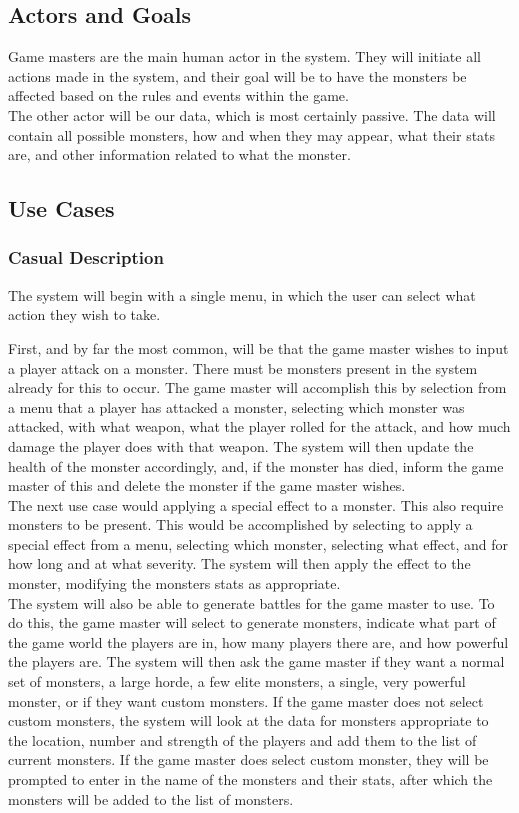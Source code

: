 \documentclass[letterpaper,12pt]{article}
\begin{document}
\subsection{Actors and Goals}
Game masters are the main human actor in the system. They will
initiate all actions made in the system, and their goal will be to
have the monsters be affected based on the rules and events within the
game.\\
The other actor will be our data, which is most certainly passive. The
data will contain all possible monsters, how and when they may appear,
what their stats are, and other information related to what the
monster.
\subsection{Use Cases}
\subsubsection{Casual Description}
The system will begin with a single menu, in which the user can select
what action they wish to take.

First, and by far the most common, will be that the game master wishes
to input a player attack on a monster. There must be monsters present
in the system already for this to occur. The game master will
accomplish this by selection from a menu that a player has attacked a
monster, selecting which monster was attacked, with what weapon, what
the player rolled for the attack, and how much damage the player does
with that weapon. The system will then update the health of the
monster accordingly, and, if the monster has died, inform the game
master of this and delete the monster if the game master wishes.\\

The next use case would applying a special effect to a monster. This
also require monsters to be present. This would be accomplished by
selecting to apply a special effect from a menu, selecting which
monster, selecting what effect, and for how long and at what
severity. The system will then apply the effect to the monster,
modifying the monsters stats as appropriate.\\

The system will also be able to generate battles for the game master
to use. To do this, the game master will select to generate monsters,
indicate what part of the game world the players are in, how many
players there are, and how powerful the players are. The system will
then ask the game master if they want a normal set of monsters, a
large horde, a few elite monsters, a single, very powerful monster, or
if they want custom monsters. If the game master does not select
custom monsters, the system will look at the data for monsters
appropriate to the location, number and strength of the players and
add them to the list of current monsters. If the game master does
select custom monster, they will be prompted to enter in the name of
the monsters and their stats, after which the monsters will be added
to the list of monsters.\\
\end{document}
